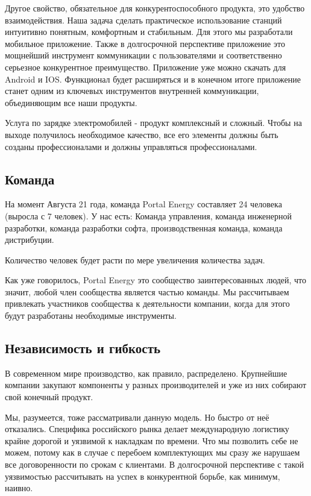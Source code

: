 \documentclass[a4paper,12pt]{report}
\begin{document}
Другое свойство, обязательное для конкурентоспособного продукта, это удобство взаимодействия. Наша задача сделать практическое использование станций интуитивно понятным, комфортным и стабильным. Для этого мы разработали мобильное приложение. Также в долгосрочной перспективе приложение это мощнейший инструмент коммуникации с пользователями и соответственно серьезное конкурентное преимущество. Приложение уже можно скачать для Android и IOS. Функционал будет расширяться и в конечном итоге приложение станет одним из ключевых инструментов внутренней коммуникации, объединяющим все наши продукты. 

Услуга по зарядке электромобилей - продукт комплексный и сложный. Чтобы на выходе получилось необходимое качество, все его элементы должны быть созданы профессионалами и должны управляться профессионалами. 


\subsection{Команда}

На момент Августа 21 года, команда Portal Energy составляет 24 человека (выросла с 7 человек). У нас есть:
Команда управления, 
команда инженерной разработки, 
команда разработки софта, 
производственная команда,
команда дистрибуции. 

Количество человек будет расти по мере увеличения количества задач. 

Как уже говорилось, Portal Energy это сообщество заинтересованных людей, что значит, любой член сообщества является частью команды. Мы рассчитываем привлекать участников сообщества к деятельности компании, когда для этого будут разработаны необходимые инструменты.

\subsection{Независимость и гибкость}

В современном мире производство, как правило, распределено. Крупнейшие компании закупают компоненты у разных производителей и уже из них собирают свой конечный продукт. 

Мы, разумеется, тоже рассматривали данную модель. Но быстро от неё отказались. Специфика российского рынка делает международную логистику крайне дорогой и уязвимой к накладкам по времени. Что мы позволить себе не можем, потому как в случае с перебоем комплектующих мы сразу же нарушаем все договоренности по срокам с клиентами. В долгосрочной перспективе с такой уязвимостью рассчитывать на успех в конкурентной борьбе, как минимум, наивно. 
\end{document}
